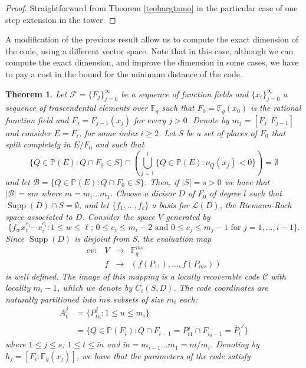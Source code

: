 \documentclass{amsart}
\newcommand{\m}{\mathcal}
\newcommand{\F}{\mathbb{F}}
\renewcommand{\P}{\mathbb{P}}
\newcommand{\supp}{\operatorname{Supp}}
\newtheorem{thm}{Theorem}[section]
\theoremstyle{definition}
\begin{document}
\begin{proof}
Straightforward from Theorem \ref{teobargtamo} in the particular  case of one step extension in the tower. 
\end{proof}

A modification of the previous result allow us to compute the exact dimension of the code, using a different vector space. Note that in this case, although we can compute the exact dimension, and improve the dimension in some cases, we have to pay a cost in the bound for the minimum distance of the code.


\begin{thm}\label{Teounr} Let $\m{F}=\{F_j\}_{j=0}^{\infty}$ be a sequence of function fields and $\{x_i\}_{j=0}^{\infty}$ a sequence of trascendental elements over $\F_q$ such that $F_0=\F_q(x_0)$ is the rational function field and $F_j=F_{j-1}(x_j)$ for every $j>0$. Denote by $m_j=[F_j:F_{j-1}]$ and consider $E=F_{i}$, for some index $i\geq 2$.  
Let $S$ be a set of places of $F_0$ that split completely in $E/F_0$ and such that  
$$\{Q \in \P(E): Q\cap F_0 \in S\}\cap\left(
\bigcup_{j=1}^{i}\{Q\in \P(E): \nu_Q(x_j)<0\}\right)=\emptyset$$ and let $\m{B}=\{Q \in \P(E): Q\cap F_0 \in S\}$.  Then, if $|S|=s>0$ we have that $|\m{B}|= sm$
where $m=m_{i}\ldots m_1$.  Choose a divisor $D$ of $F_0$ of degree $l$ such that $\supp(D)\cap S=\emptyset$, and let $\{f_1, \ldots, f_\ell \}$ a basis for $\m{L}(D)$, the Riemann-Roch space associated to $D$. Consider the space $V$ generated by 
$$\{f_wx_1^{e_1}\cdots x_{i}^{e_{i}}:1\leq w \leq \ell;\, 0\leq e_i \leq m_i-2\text{ and }0 \leq  e_j\leq m_j-1 \text{ for }j=1,\ldots, i-1 \}.$$ Since $\supp(D)$ is disjoint from S, the evaluation map 
$$
\begin{array}{cccl}
 ev: & V  &  \longrightarrow& \F_q^{ms} \\
 & f& \rightarrow  &  (f(P_{11}), \ldots, f(P_{ms}) )
\end{array}
$$ is well defined. The image of this mapping is a locally recoverable code $\m{C}$ with locality $m_{i}-1$, which we denote by
$C_{i}(S,D)$. The code coordinates are naturally partitioned into $\widetilde{m}s$ subsets of size $m_{i}$ each: \begin{align*}
A_t^j &= \{P_{tu}^j:%
1 \leq u \leq m_{i}\}\\
& =\{Q\in \P(F_{i}): Q\cap F_{i-1}=P_{t1}^j\cap F_{i_0-1}=\widetilde{P_{t}}^j\}%
\end{align*} where $1\leq j \leq s$; $1\leq t \leq \widetilde{m}$ and $\widetilde{m}=m_{i-1}\ldots m_1=m/m_{i}$. Denoting by $h_j=[F_{i}:\F_q(x_j)]$, we have that the parameters of the code satisfy


\end{thm}
\end{document}
